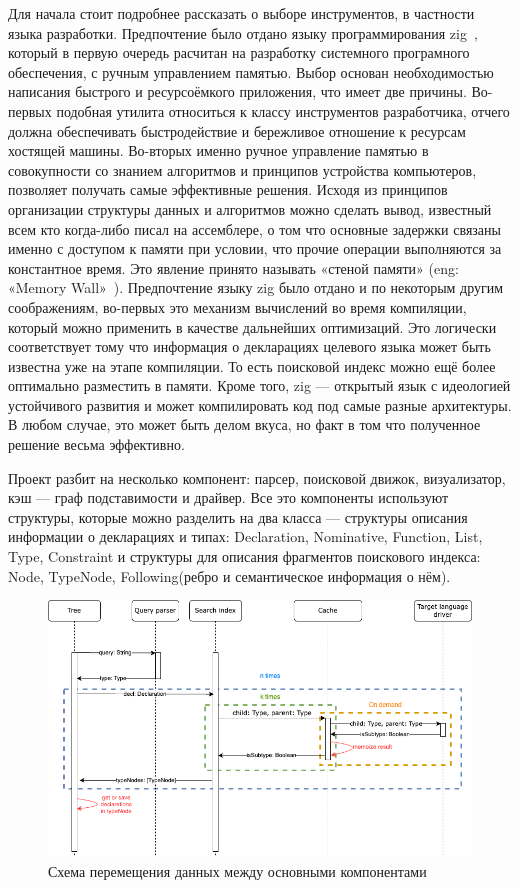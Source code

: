 \documentclass[times]{itmo-student-thesis}
\begin{document}
	Для начала стоит подробнее рассказать о выборе инструментов, в частности языка разработки. Предпочтение было отдано языку программирования zig~\cite{zig}, который в первую очередь расчитан на разработку системного програмного обеспечения, с ручным управлением памятью. Выбор основан необходимостью написания быстрого и ресурсоёмкого приложения, что имеет две причины. Во-первых подобная утилита относиться к классу инструментов разработчика, отчего должна обеспечивать быстродействие и бережливое отношение к ресурсам хостящей машины. Во-вторых именно ручное управление памятью в совокупности со знанием алгоритмов и принципов устройства компьютеров, позволяет получать самые эффективные решения. Исходя из принципов организации структуры данных и алгоритмов можно сделать вывод, известный всем кто когда-либо писал на ассемблере, о том что основные задержки связаны именно с доступом к памяти при условии, что прочие операции выполняются за константное время. Это явление принято называть «стеной памяти» (eng: «Memory Wall»~\cite{memorywall}). Предпочтение языку zig было отдано и по некоторым другим соображениям, во-первых это механизм вычислений во время компиляции, который можно применить в качестве дальнейших оптимизаций. Это логически соответствует тому что информация о декларациях целевого языка может быть известна уже на этапе компиляции. То есть поисковой индекс можно ещё более оптимально разместить в памяти. Кроме того, zig --- открытый язык с идеологией устойчивого развития и может компилировать код под самые разные архитектуры. В любом случае, это может быть делом вкуса, но факт в том что полученное решение весьма эффективно.
	
	Проект разбит на несколько компонент: парсер, поисковой движок, визуализатор, кэш --- граф подставимости и драйвер. Все это компоненты используют структуры, которые можно разделить на два класса --- структуры описания информации о декларациях и типах: Declaration, Nominative, Function, List, Type, Constraint и структуры для описания фрагментов поискового индекса: Node, TypeNode, Following(ребро и семантическое информация о нём).
	
	\begin{figure}[!h]
		\caption{Схема перемещения данных между основными компонентами} \label{dataflow}
		\centering
		\includegraphics[width=0.8\columnwidth]{images/dataflow.png}
	\end{figure}
	
\end{document}
